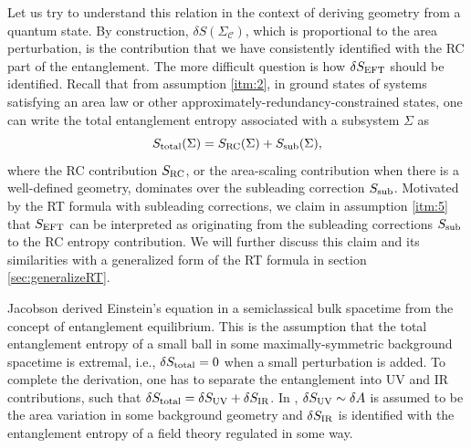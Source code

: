 \documentclass[%
12pt,preprint,
nofootinbib,
amsmath,amssymb,
aps,
prd,
showpacs,
superscriptaddress
]{revtex4-2}
\newcommand{\region}{\Sigma}
\begin{document}
Let us try to understand this relation in the context of deriving geometry from a quantum state. By construction, $\delta S({\region}_{\mathcal{C}})$, which is proportional to the area perturbation, is the contribution that we have consistently identified with the RC part of the entanglement. 
The more difficult question is how $\delta S_{\rm EFT}$ should be identified.
Recall that from assumption \ref{itm:2}, in ground states of systems satisfying an area law \cite{AreaLawEntRev} or other approximately-redundancy-constrained states, one can write the total entanglement entropy associated with a subsystem ${\region}$ as 
\begin{equation}
S_{\rm total}({\region}) = S_{\rm RC}({\region}) + S_{\rm sub}({\region}),
\label{eqn:entropysum}
\end{equation}
where the RC contribution $S_{\rm RC}$, or the area-scaling contribution when there is a well-defined geometry, dominates over the subleading correction $S_{\rm sub}$. 
 Motivated by the RT formula with subleading corrections, we claim in assumption \ref{itm:5} that $S_{\rm EFT}$ can be interpreted as originating from the subleading corrections $S_{\rm sub}$ to the RC entropy contribution. We will further discuss this claim and its similarities with a generalized form of the RT formula in section \ref{sec:generalizeRT}.

Jacobson \cite{Jacobson:2015hqa} derived Einstein's equation in a semiclassical bulk spacetime from the concept of entanglement equilibrium. This is the assumption that the total entanglement entropy of a small ball in some maximally-symmetric background spacetime is extremal, i.e., $\delta S_{\rm total} =0$ when a small perturbation is added. To complete the derivation, one has to separate the entanglement into UV and IR contributions, such that $\delta S_{\rm total}= \delta S_{\rm UV}+ \delta S_{\rm IR}$. In  \cite{Jacobson:2015hqa}, $\delta S_{\rm UV}\sim \delta A$ is assumed to be the area variation in some background geometry and $\delta S_{\rm IR}$ is identified with the entanglement entropy of a field theory regulated in some way.
\end{document}
